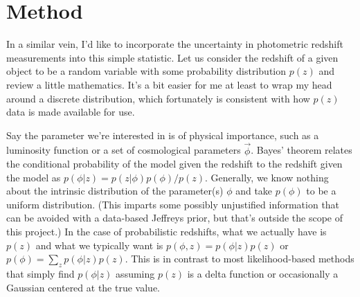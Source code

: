 \documentclass[12pt, onecolumn]{emulateapj}
\begin{document}
\section{Method}

In a similar vein, I'd like to incorporate the uncertainty in photometric redshift measurements into this simple statistic.  Let us consider the redshift of a given object to be a random variable with some probability distribution $p(z)$ and review a little mathematics.  It's a bit easier for me at least to wrap my head around a discrete distribution, which fortunately is consistent with how $p(z)$ data is made available for use.

Say the parameter we're interested in is of physical importance, such as a luminosity function or a set of cosmological parameters $\vec{\phi}$.  Bayes' theorem relates the conditional probability of the model given the redshift to the redshift given the model as $p(\phi|z)=p(z|\phi)p(\phi)/p(z)$.  Generally, we know nothing about the intrinsic distribution of the parameter(s) $\phi$ and take $p(\phi)$ to be a uniform distribution.  (This imparts some possibly unjustified information that can be avoided with a data-based Jeffreys prior, but that's outside the scope of this project.)  In the case of probabilistic redshifts, what we actually have is $p(z)$ and what we typically want is $p(\phi,z)=p(\phi|z)p(z)$ or $p(\phi)=\sum_{z}p(\phi|z)p(z)$.  This is in contrast to most likelihood-based methods that simply find $p(\phi|z)$ assuming $p(z)$ is a delta function or occasionally a Gaussian centered at the true value.
\end{document}
